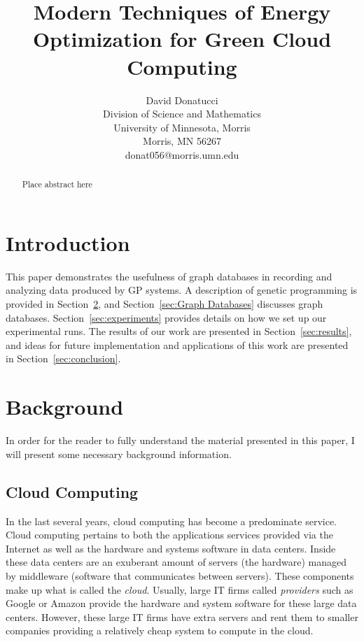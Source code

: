 \documentclass[12pt]{article}
\title{Modern Techniques of Energy Optimization for Green Cloud Computing}
\author{
 		David Donatucci\\
        Division of Science and Mathematics\\
        University of Minnesota, Morris\\
        Morris, MN 56267\\
        donat056@morris.umn.edu\\
}
\date{}
\begin{document}
\pagestyle{plain}

\maketitle

\begin{abstract}

Place abstract here

\end{abstract}

\section{Introduction} \label{sec:intro}

This paper demonstrates the usefulness of graph databases in recording and analyzing data produced by GP systems. A description of genetic programming is provided in Section~\ref{Background}, and Section~\ref{sec:Graph Databases} discusses graph databases. Section~\ref{sec:experiments} provides details on how we set up our experimental runs. The results of our work are presented in Section~\ref{sec:results}, and ideas for future implementation and applications of this work are presented in Section~\ref{sec:conclusion}.

\section{Background} \label{Background}

In order for the reader to fully understand the material presented in this paper, I will present some necessary background information.

\subsection{Cloud Computing}
\label{sec:Cloud Computing}

In the last several years, cloud computing has become a predominate service. Cloud computing pertains to both the applications services provided via the Internet as well as the hardware and systems software in data centers. Inside these data centers are an exuberant amount of servers (the hardware) managed by middleware (software that communicates between servers). These components make up what is called the \emph{cloud}.  Usually, large IT firms called \emph{providers} such as Google or Amazon provide the hardware and system software for these large data centers. However, these large IT firms have extra servers and rent them to smaller companies providing a relatively cheap system to compute in the cloud. \cite{Armbrust} 
\end{document}
